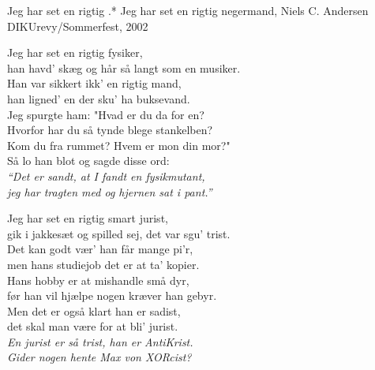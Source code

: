\begin{song}{Jeg har set en rigtig .*}
  {} %
  {Jeg har set en rigtig negermand, Niels C. Andersen} %
  {} %
  {DIKUrevy/Sommerfest, 2002} %
  {\NotCCLIed} %

  \begin{SBVerse}
    Jeg har set en rigtig fysiker,\\
    han havd’ skæg og hår så langt som en musiker.\\
    Han var sikkert ikk’ en rigtig mand,\\
    han ligned’ en der sku’ ha buksevand.\\\medskip
    Jeg spurgte ham: "Hvad er du da for en?\\
    Hvorfor har du så tynde blege stankelben?\\
    Kom du fra rummet? Hvem er mon din mor?"\\
    Så lo han blot og sagde disse ord:\\\medskip
    \emph{``Det er sandt, at I fandt en fysikmutant,\\
    jeg har tragten med og hjernen sat i pant.''}
  \end{SBVerse}

  \begin{SBVerse}
    Jeg har set en rigtig smart jurist,\\
    gik i jakkesæt og spilled sej, det var sgu’ trist.\\
    Det kan godt vær’ han får mange pi’r,\\
    men hans studiejob det er at ta’ kopier.\\\medskip
    Hans hobby er at mishandle små dyr,\\
    før han vil hjælpe nogen kræver han gebyr.\\
    Men det er også klart han er sadist,\\
    det skal man være for at bli’ jurist.\\\medskip
    \emph{En jurist er så trist, han er AntiKrist.\\
    Gider nogen hente Max von XORcist?}
  \end{SBVerse}


\end{song}
